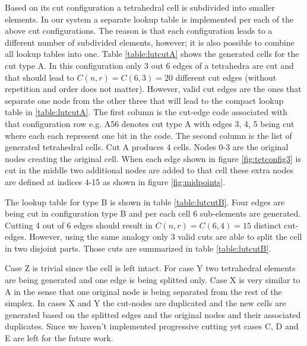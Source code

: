 Based on its cut configuration a tetrahedral cell is subdivided into smaller elements. In our system a separate lookup table is 
implemented per each of the above cut configurations. The reason is that each configuration leads to a different number of subdivided elements, however;
it is also possible to combine all lookup tables into one. Table \ref{table:lutcutA} shows the generated cells for the cut type A.
In this configuration only 3 out 6 edges of a tetrahedra are cut and that should lead to $C(n, r) = C(6, 3) = 20$ different cut edges (without repetition and
order does not matter). However, valid cut edges are the ones that separate one node from the other three that will lead to the compact lookup table in \ref{table:lutcutA}.
The first column is the cut-edge code associated with that configuration row e.g. A56 denotes cut type A with edges 3, 4, 5 being cut where each each represent one bit in 
the code. The second column is the list of generated tetrahedral cells. Cut A produces 4 cells. Nodes 0-3 are the original nodes creating the original cell. When each edge 
shown in figure \ref{fig:tetconfig3} is cut in the middle two additional nodes are added to that cell these extra nodes are defined at indices 4-15 as shown in figure 
\ref{fig:midpoints}.

The lookup table for type B is shown in table \ref{table:lutcutB}. Four edges are being cut in configuration type B and per each cell 6 sub-elements are generated.
Cutting 4 out of 6 edges should result in $C(n, r) = C(6, 4) = 15$ distinct cut-edges. However, using the same analogy only 3 valid cuts are able to split the cell 
in two disjoint parts. Those cuts are summarized in table \ref{table:lutcutB}. 

Case Z is trivial since the cell is left intact. For case Y two tetrahedral elements are being generated and one edge is being splitted only. Case X is very similar to
A in the sense that one original node is being separated from the rest of the simplex. In cases X and Y the cut-nodes are duplicated and the new cells are generated based
on the splitted edges and the original nodes and their associated duplicates. Since we haven't implemented progressive cutting yet cases C, D and E are left for the future work.

